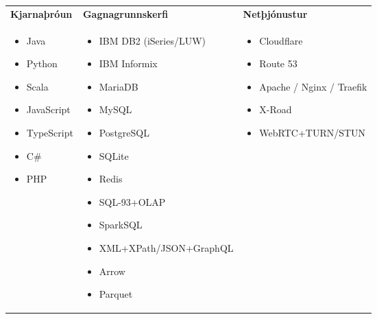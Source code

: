\documentclass[a4paper,10pt]{article}
\begin{document}
  \begin{tabular}{L{\skillcolwidth}|L{\skillcolwidth}|L{\skillcolwidth}}
  \textbf{Kjarnaþróun} & 
  \textbf{Gagnagrunnskerfi} & 
  \textbf{Netþjónustur} \\
  \begin{itemize}[leftmargin=*]
    \item Java
    \item Python
    \item Scala
    \item JavaScript
    \item TypeScript
    \item C\#
    \item PHP
  \end{itemize} & 
  \begin{itemize}[leftmargin=*]
    \item IBM DB2 (iSeries/LUW)
    \item IBM Informix
    \item MariaDB
    \item MySQL
    \item PostgreSQL
    \item SQLite
    \item Redis
    \item SQL-93+OLAP
    \item SparkSQL
    \item XML+XPath/JSON+GraphQL
    \item Arrow
    \item Parquet
  \end{itemize} & 
  \begin{itemize}[leftmargin=*]
    \item Cloudflare
    \item Route 53
    \item Apache / Nginx / Traefik
    \item X-Road
    \item WebRTC+TURN/STUN
  \end{itemize} \\
  \hline
  

\end{tabular}
\end{document}
